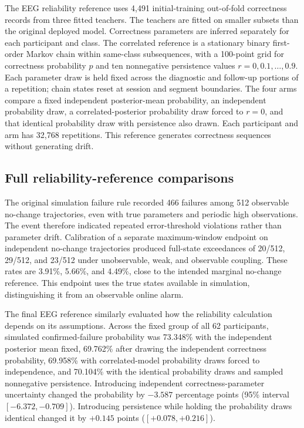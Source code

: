 \documentclass[11pt,a4paper]{article}
\begin{document}
The EEG reliability reference uses 4,491 initial-training out-of-fold correctness records from three fitted teachers. The teachers are fitted on smaller subsets than the original deployed model. Correctness parameters are inferred separately for each participant and class. The correlated reference is a stationary binary first-order Markov chain within same-class subsequences, with a 100-point grid for correctness probability $p$ and ten nonnegative persistence values $r=0,0.1,\ldots,0.9$. Each parameter draw is held fixed across the diagnostic and follow-up portions of a repetition; chain states reset at session and segment boundaries. The four arms compare a fixed independent posterior-mean probability, an independent probability draw, a correlated-posterior probability draw forced to $r=0$, and that identical probability draw with persistence also drawn. Each participant and arm has 32,768 repetitions. This reference generates correctness sequences without generating drift.

\subsection{Full reliability-reference comparisons}
\label{sec:reliability}


The original simulation failure rule recorded 466 failures among 512 observable no-change trajectories, even with true parameters and periodic high observations. The event therefore indicated repeated error-threshold violations rather than parameter drift. Calibration of a separate maximum-window endpoint on independent no-change trajectories produced full-state exceedances of 20/512, 29/512, and 23/512 under unobservable, weak, and observable coupling. These rates are 3.91\%, 5.66\%, and 4.49\%, close to the intended marginal no-change reference. This endpoint uses the true states available in simulation, distinguishing it from an observable online alarm.

The final EEG reference similarly evaluated how the reliability calculation depends on its assumptions. Across the fixed group of all 62 participants, simulated confirmed-failure probability was 73.348\% with the independent posterior mean fixed, 69.762\% after drawing the independent correctness probability, 69.958\% with correlated-model probability draws forced to independence, and 70.104\% with the identical probability draws and sampled nonnegative persistence. Introducing independent correctness-parameter uncertainty changed the probability by $-3.587$ percentage points (95\% interval $[-6.372,-0.709]$). Introducing persistence while holding the probability draws identical changed it by $+0.145$ points ($[+0.078,+0.216]$).
\end{document}
